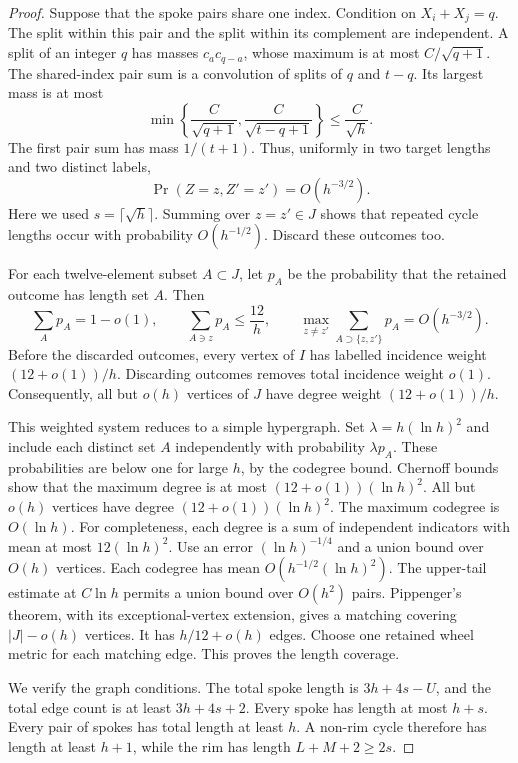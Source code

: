 \begin{proof}
Suppose that the spoke pairs share one index.
Condition on $X_i+X_j=q$.
The split within this pair and the split within its complement are independent.
A split of an integer $q$ has masses $c_a c_{q-a}$, whose maximum is at most $C/\sqrt{q+1}$.
The shared-index pair sum is a convolution of splits of $q$ and $t-q$.
Its largest mass is at most
\[
 \min\left\{\frac C{\sqrt{q+1}},\frac C{\sqrt{t-q+1}}\right\}
 \le\frac C{\sqrt h}.
\]
The first pair sum has mass $1/(t+1)$.
Thus, uniformly in two target lengths and two distinct labels,
\begin{equation}
 \Pr(Z=z,Z'=z')=O(h^{-3/2}).
 \label{eq:rhost-wheel-codegree}
\end{equation}
Here we used $s=\lceil\sqrt h\rceil$.
Summing over $z=z'\in J$ shows that repeated cycle lengths occur with probability $O(h^{-1/2})$.
Discard these outcomes too.

For each twelve-element subset $A\subset J$, let $p_A$ be the probability that the retained outcome has length set $A$.
Then
\[
 \sum_Ap_A=1-o(1),\qquad
 \sum_{A\ni z}p_A\le\frac{12}h,\qquad
 \max_{z\ne z'}\sum_{A\supset\{z,z'\}}p_A=O(h^{-3/2}).
\]
Before the discarded outcomes, every vertex of $I$ has labelled incidence weight $(12+o(1))/h$.
Discarding outcomes removes total incidence weight $o(1)$.
Consequently, all but $o(h)$ vertices of $J$ have degree weight $(12+o(1))/h$.

This weighted system reduces to a simple hypergraph.
Set $\lambda=h(\ln h)^2$ and include each distinct set $A$ independently with probability $\lambda p_A$.
These probabilities are below one for large $h$, by the codegree bound.
Chernoff bounds show that the maximum degree is at most $(12+o(1))(\ln h)^2$.
All but $o(h)$ vertices have degree $(12+o(1))(\ln h)^2$.
The maximum codegree is $O(\ln h)$.
For completeness, each degree is a sum of independent indicators with mean at most $12(\ln h)^2$.
Use an error $(\ln h)^{-1/4}$ and a union bound over $O(h)$ vertices.
Each codegree has mean $O(h^{-1/2}(\ln h)^2)$.
The upper-tail estimate at $C\ln h$ permits a union bound over $O(h^2)$ pairs.
Pippenger's theorem, with its exceptional-vertex extension, gives a matching covering $|J|-o(h)$ vertices.
It has $h/12+o(h)$ edges.
Choose one retained wheel metric for each matching edge.
This proves the length coverage.

We verify the graph conditions.
The total spoke length is $3h+4s-U$, and the total edge count is at least $3h+4s+2$.
Every spoke has length at most $h+s$.
Every pair of spokes has total length at least $h$.
A non-rim cycle therefore has length at least $h+1$, while the rim has length $L+M+2\ge2s$.


\end{proof}
